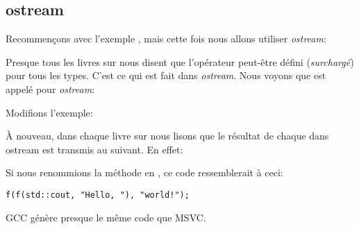 \subsection{ostream}

Recommençons avec l'exemple , mais cette fois nous allons utiliser
\emph{ostream}:



Presque tous les livres sur \Cpp nous disent que l'opérateur \TT{<<} peut-être défini
(\emph{surchargé}) pour tous les types.
C'est ce qui est fait dans \emph{ostream}.
Nous voyons que  est appelé pour \emph{ostream}:



Modifions l'exemple:



À nouveau, dans chaque livre sur \Cpp nous lisons que le résultat de chaque 
dans ostream est transmis au suivant.
En effet:



Si nous renommions la méthode  en \ttf{}, ce code ressemblerait
à ceci:

\begin{lstlisting}[style=customc]
f(f(std::cout, "Hello, "), "world!");
\end{lstlisting}

GCC génère presque le même code que MSVC.

